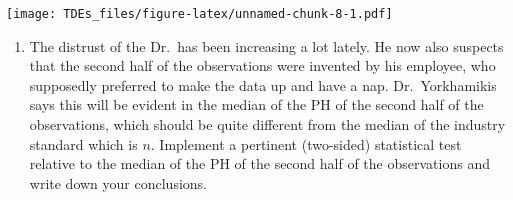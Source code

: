 \documentclass[
]{article}
\newenvironment{Shaded}{\begin{snugshade}}{\end{snugshade}}
\newcommand{\CommentTok}[1]{\textcolor[rgb]{0.56,0.35,0.01}{\textit{#1}}}
\newcommand{\ControlFlowTok}[1]{\textcolor[rgb]{0.13,0.29,0.53}{\textbf{#1}}}
\newcommand{\DecValTok}[1]{\textcolor[rgb]{0.00,0.00,0.81}{#1}}
\newcommand{\FunctionTok}[1]{\textcolor[rgb]{0.13,0.29,0.53}{\textbf{#1}}}
\newcommand{\NormalTok}[1]{#1}
\newcommand{\OtherTok}[1]{\textcolor[rgb]{0.56,0.35,0.01}{#1}}
\newcommand{\SpecialCharTok}[1]{\textcolor[rgb]{0.81,0.36,0.00}{\textbf{#1}}}
\providecommand{\tightlist}{%
  \setlength{\itemsep}{0pt}\setlength{\parskip}{0pt}}
\begin{document}
\texttt{[image: TDEs\_files/figure-latex/unnamed-chunk-8-1.pdf]}

\begin{Shaded}
\end{Shaded}

\begin{enumerate}
\def\labelenumi{\arabic{enumi}.}
\setcounter{enumi}{1}
\tightlist
\item
  The distrust of the Dr.~has been increasing a lot lately. He now also
  suspects that the second half of the observations were invented by his
  employee, who supposedly preferred to make the data up and have a nap.
  Dr.~Yorkhamikis says this will be evident in the median of the PH of
  the second half of the observations, which should be quite different
  from the median of the industry standard which is \(n\). Implement a
  pertinent (two-sided) statistical test relative to the median of the
  PH of the second half of the observations and write down your
  conclusions.
\end{enumerate}

\begin{Shaded}
\end{Shaded}
\end{document}
